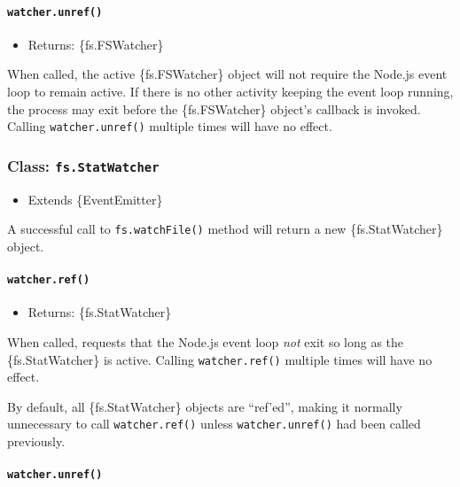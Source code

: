 \paragraph{\texorpdfstring{\texttt{watcher.unref()}}{watcher.unref()}}\label{watcher.unref}

\begin{itemize}
\tightlist
\item
  Returns: \{fs.FSWatcher\}
\end{itemize}

When called, the active \{fs.FSWatcher\} object will not require the
Node.js event loop to remain active. If there is no other activity
keeping the event loop running, the process may exit before the
\{fs.FSWatcher\} object's callback is invoked. Calling
\texttt{watcher.unref()} multiple times will have no effect.

\subsubsection{\texorpdfstring{Class:
\texttt{fs.StatWatcher}}{Class: fs.StatWatcher}}\label{class-fs.statwatcher}

\begin{itemize}
\tightlist
\item
  Extends \{EventEmitter\}
\end{itemize}

A successful call to \texttt{fs.watchFile()} method will return a new
\{fs.StatWatcher\} object.

\paragraph{\texorpdfstring{\texttt{watcher.ref()}}{watcher.ref()}}\label{watcher.ref-1}

\begin{itemize}
\tightlist
\item
  Returns: \{fs.StatWatcher\}
\end{itemize}

When called, requests that the Node.js event loop \emph{not} exit so
long as the \{fs.StatWatcher\} is active. Calling \texttt{watcher.ref()}
multiple times will have no effect.

By default, all \{fs.StatWatcher\} objects are ``ref'ed'', making it
normally unnecessary to call \texttt{watcher.ref()} unless
\texttt{watcher.unref()} had been called previously.

\paragraph{\texorpdfstring{\texttt{watcher.unref()}}{watcher.unref()}}\label{watcher.unref-1}

